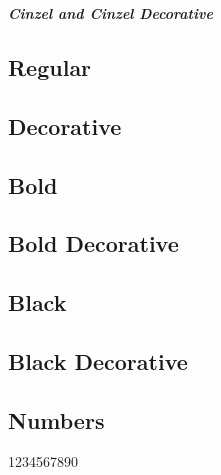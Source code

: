 \documentclass[12pt]{article}
\begin{document}
\thispagestyle{empty}

\begin{center}\LARGE\bfseries\itshape
Cinzel and Cinzel Decorative
\end{center}

\sloppy
\subsection*{Regular}
\lipsum[1]

\subsection*{Decorative}
\textit{\lipsum[2]}

\subsection*{Bold}
\textbf{\lipsum[3]}

\subsection*{Bold Decorative}

\textbf{\textit{\lipsum[4]}}

\subsection*{Black}
{\cinzelblack\lipsum[4]}

\subsection*{Black Decorative}
{\cinzelblack\textit{\lipsum[5]}}

\subsection*{Numbers}

1234567890
\end{document}
